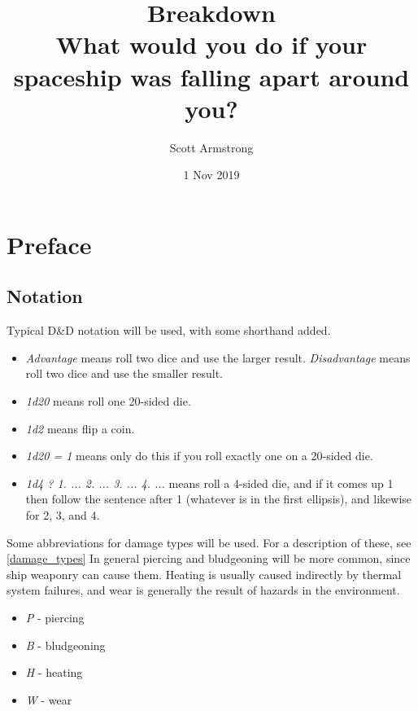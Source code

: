 \documentclass[a4paper]{article}
\title{Breakdown \\ {\large What would you do if your spaceship was falling apart around you?}}
\author{Scott Armstrong}
\date{1 Nov 2019}
\begin{document}
\maketitle

\begin{abstract}


\end{abstract}

\setcounter{tocdepth}{2}
\tableofcontents

\section{Preface} \label{preface}

\subsection{Notation} \label{preface_notation}
Typical D\&D notation will be used, with some shorthand added. 
\begin{itemize}
\item \textit{Advantage} means roll two dice and use the larger result. \textit{Disadvantage} means roll two dice and use the smaller result.
\item \textit{1d20} means roll one 20-sided die.
\item \textit{1d2} means flip a coin.
\item \textit{1d20 = 1} means only do this if you roll exactly one on a 20-sided die.
\item \textit{1d4 ? 1. ... 2. ... 3. ... 4. ...} means roll a 4-sided die, and if it comes up 1 then follow the sentence after 1 (whatever is in the first ellipsis), and likewise for 2, 3, and 4.
\end{itemize}

\vspace{0.2cm} \hspace{-18pt} Some abbreviations for damage types will be used. For a description of these, see \ref{damage_types} In general piercing and bludgeoning will be more common, since ship weaponry can cause them. Heating is usually caused indirectly by thermal system failures, and wear is generally the result of hazards in the environment.
\begin{itemize}
\item \textit{P} - piercing
\item \textit{B} - bludgeoning
\item \textit{H} - heating
\item \textit{W} - wear
\end{itemize}
\end{document}
